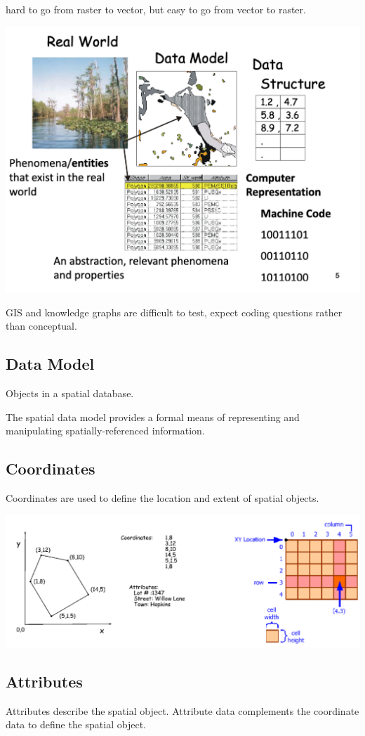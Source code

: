 \documentclass[11pt]{article}
\theoremstyle{definition}
\begin{document}
hard to go from raster to vector, but easy to go from vector to raster.

\includegraphics[width=\textwidth]{3.png}

GIS and knowledge graphs are difficult to test, expect coding questions rather than conceptual.

\subsection{Data Model}
Objects in a spatial
database.

The spatial data
model provides a
formal means of
representing and
manipulating
spatially-referenced
information.

\subsection{Coordinates}
Coordinates are used to define the
location and extent of spatial objects.

\includegraphics[width=\textwidth/2]{4.png}

\subsection{Attributes}
Attributes describe the spatial object.
Attribute data complements the coordinate
data to define the spatial object.
\end{document}
